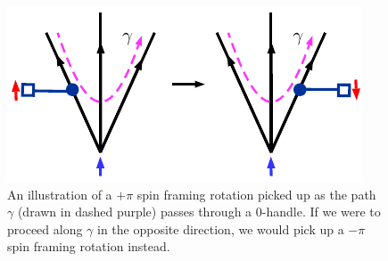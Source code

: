 \documentclass[12pt,a4paper]{article}
\newcommand{\cc}{\mathbb{C}}
\newcommand{\kw}[1]{{\color{kwcolor}\footnotesize{(KW) #1}}}
\newcommand{\ethan}[1]{{\color{amethyst}\footnotesize{(EL) #1}}}
\begin{document}

\medskip

\begin{figure}
\begin{center}
\includegraphics{spin_rot_through_0handle.pdf}
\caption{ \label{spin_rot_through_0handle} An illustration of a $+\pi$ spin framing rotation picked up as the path $\gamma$ (drawn in dashed purple) passes through a 0-handle. 
If we were to proceed along $\gamma$ in the opposite direction, we would pick up a $-\pi$ spin framing rotation instead. %
  }
\end{center}
\end{figure}
\end{document}
